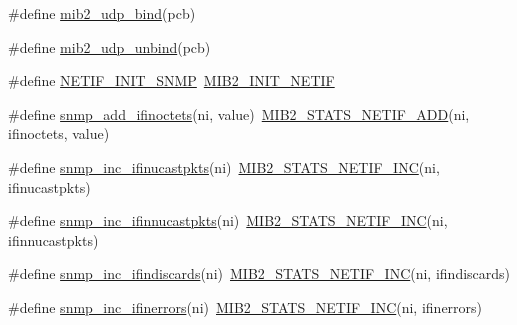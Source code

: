 \begin{DoxyCompactItemize}
\item 
\#define \hyperlink{openmote-cc2538_2lwip_2src_2include_2lwip_2snmp_8h_acfc2d746bbaf82da4c34bbc65122931f}{mib2\+\_\+udp\+\_\+bind}(pcb)
\item 
\#define \hyperlink{openmote-cc2538_2lwip_2src_2include_2lwip_2snmp_8h_a701a7670780a5e1663766efb7819a57b}{mib2\+\_\+udp\+\_\+unbind}(pcb)
\item 
\#define \hyperlink{openmote-cc2538_2lwip_2src_2include_2lwip_2snmp_8h_a39c18660772ac80d7f9abe83dcc81662}{N\+E\+T\+I\+F\+\_\+\+I\+N\+I\+T\+\_\+\+S\+N\+MP}~\hyperlink{openmote-cc2538_2lwip_2src_2include_2lwip_2snmp_8h_a5be1b8cba1d67bf6e7f8851ec91b10f0}{M\+I\+B2\+\_\+\+I\+N\+I\+T\+\_\+\+N\+E\+T\+IF}
\item 
\#define \hyperlink{openmote-cc2538_2lwip_2src_2include_2lwip_2snmp_8h_ad5b6b1b1fbc1949076ceb282622c61b6}{snmp\+\_\+add\+\_\+ifinoctets}(ni,  value)~\hyperlink{openmote-cc2538_2lwip_2src_2include_2lwip_2snmp_8h_a05641438775014b7e13b9e55eba48bed}{M\+I\+B2\+\_\+\+S\+T\+A\+T\+S\+\_\+\+N\+E\+T\+I\+F\+\_\+\+A\+DD}(ni, ifinoctets, value)
\item 
\#define \hyperlink{openmote-cc2538_2lwip_2src_2include_2lwip_2snmp_8h_a9e77e37cfb2281b316f9b3237be641df}{snmp\+\_\+inc\+\_\+ifinucastpkts}(ni)~\hyperlink{openmote-cc2538_2lwip_2src_2include_2lwip_2snmp_8h_a3c52caf566d37705c6547f2d025afd9f}{M\+I\+B2\+\_\+\+S\+T\+A\+T\+S\+\_\+\+N\+E\+T\+I\+F\+\_\+\+I\+NC}(ni, ifinucastpkts)
\item 
\#define \hyperlink{openmote-cc2538_2lwip_2src_2include_2lwip_2snmp_8h_a6baa8859ef2808ba4b9328862154f6c3}{snmp\+\_\+inc\+\_\+ifinnucastpkts}(ni)~\hyperlink{openmote-cc2538_2lwip_2src_2include_2lwip_2snmp_8h_a3c52caf566d37705c6547f2d025afd9f}{M\+I\+B2\+\_\+\+S\+T\+A\+T\+S\+\_\+\+N\+E\+T\+I\+F\+\_\+\+I\+NC}(ni, ifinnucastpkts)
\item 
\#define \hyperlink{openmote-cc2538_2lwip_2src_2include_2lwip_2snmp_8h_a858d20d2c19a6b34a328b8bf229da6b6}{snmp\+\_\+inc\+\_\+ifindiscards}(ni)~\hyperlink{openmote-cc2538_2lwip_2src_2include_2lwip_2snmp_8h_a3c52caf566d37705c6547f2d025afd9f}{M\+I\+B2\+\_\+\+S\+T\+A\+T\+S\+\_\+\+N\+E\+T\+I\+F\+\_\+\+I\+NC}(ni, ifindiscards)
\item 
\#define \hyperlink{openmote-cc2538_2lwip_2src_2include_2lwip_2snmp_8h_ae18e28e0a58c68de6a9907faa566634e}{snmp\+\_\+inc\+\_\+ifinerrors}(ni)~\hyperlink{openmote-cc2538_2lwip_2src_2include_2lwip_2snmp_8h_a3c52caf566d37705c6547f2d025afd9f}{M\+I\+B2\+\_\+\+S\+T\+A\+T\+S\+\_\+\+N\+E\+T\+I\+F\+\_\+\+I\+NC}(ni, ifinerrors)
\item 

\end{DoxyCompactItemize}
